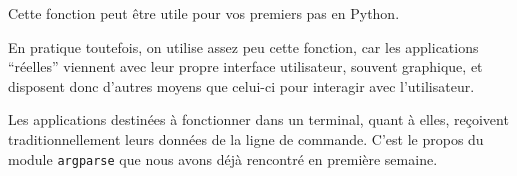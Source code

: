     Cette fonction peut être utile pour vos premiers pas en Python.

En pratique toutefois, on utilise assez peu cette fonction, car les
applications ``réelles'' viennent avec leur propre interface
utilisateur, souvent graphique, et disposent donc d'autres moyens que
celui-ci pour interagir avec l'utilisateur.

Les applications destinées à fonctionner dans un terminal, quant à
elles, reçoivent traditionnellement leurs données de la ligne de
commande. C'est le propos du module \texttt{argparse} que nous avons
déjà rencontré en première semaine.


    
    
    
